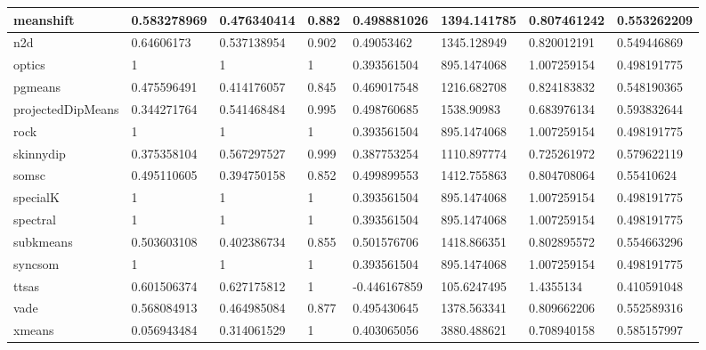 \begin{table}[H]
\begin{tabular}{|l|l|l|l|l|l|l|l|}
\hline
meanshift & 0.583278969 & 0.476340414 & 0.882 & 0.498881026 & 1394.141785 & 0.807461242 & 0.553262209 \\
\hline
n2d & 0.64606173 & 0.537138954 & 0.902 & 0.49053462 & 1345.128949 & 0.820012191 & 0.549446869 \\
\hline
optics & 1 & 1 & 1 & 0.393561504 & 895.1474068 & 1.007259154 & 0.498191775 \\
\hline
pgmeans & 0.475596491 & 0.414176057 & 0.845 & 0.469017548 & 1216.682708 & 0.824183832 & 0.548190365 \\
\hline
projectedDipMeans & 0.344271764 & 0.541468484 & 0.995 & 0.498760685 & 1538.90983 & 0.683976134 & 0.593832644 \\
\hline
rock & 1 & 1 & 1 & 0.393561504 & 895.1474068 & 1.007259154 & 0.498191775 \\
\hline
skinnydip & 0.375358104 & 0.567297527 & 0.999 & 0.387753254 & 1110.897774 & 0.725261972 & 0.579622119 \\
\hline
somsc & 0.495110605 & 0.394750158 & 0.852 & 0.499899553 & 1412.755863 & 0.804708064 & 0.55410624 \\
\hline
specialK & 1 & 1 & 1 & 0.393561504 & 895.1474068 & 1.007259154 & 0.498191775 \\
\hline
spectral & 1 & 1 & 1 & 0.393561504 & 895.1474068 & 1.007259154 & 0.498191775 \\
\hline
subkmeans & 0.503603108 & 0.402386734 & 0.855 & 0.501576706 & 1418.866351 & 0.802895572 & 0.554663296 \\
\hline
syncsom & 1 & 1 & 1 & 0.393561504 & 895.1474068 & 1.007259154 & 0.498191775 \\
\hline
ttsas & 0.601506374 & 0.627175812 & 1 & -0.446167859 & 105.6247495 & 1.4355134 & 0.410591048 \\
\hline
vade & 0.568084913 & 0.464985084 & 0.877 & 0.495430645 & 1378.563341 & 0.809662206 & 0.552589316 \\
\hline
xmeans & 0.056943484 & 0.314061529 & 1 & 0.403065056 & 3880.488621 & 0.708940158 & 0.585157997 \\
\hline
\end{tabular}
\end{table}

\clearpage

